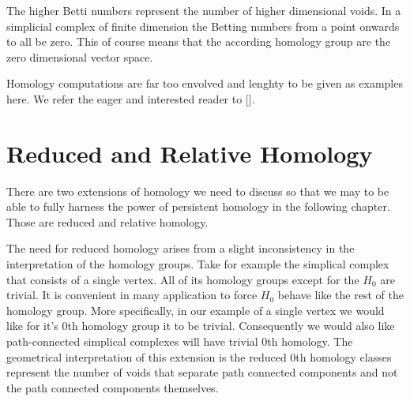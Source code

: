 The higher Betti numbers represent the number of higher dimensional voids. In a simplicial complex of finite dimension the Betting numbers from a point onwards to all be zero. This of course means that the according homology group are the zero dimensional vector space.

Homology computations are far too envolved and lenghty to be given as examples here. We refer the eager and interested reader to [].





\section{Reduced and Relative Homology}

There are two extensions of homology we need to discuss so that we may to be able to fully harness the power of persistent homology in the following chapter. Those are reduced and relative homology.

The need for reduced homology arises from a slight inconsistency in the interpretation of the homology groups. Take for example the simplical complex that consists of a single vertex. All of its homology groups except for the $H_0$ are trivial. It is convenient in many application to force $H_0$ behave like the rest of the homology group. More specifically, in our example of a single vertex we would like for it's 0th homology group it to be trivial. Consequently we would also like path-connected simplical complexes will have trivial 0th homology. The geometrical interpretation of this extension is the reduced 0th homology classes represent the number of voids that separate path connected components and not the path connected components themselves.

